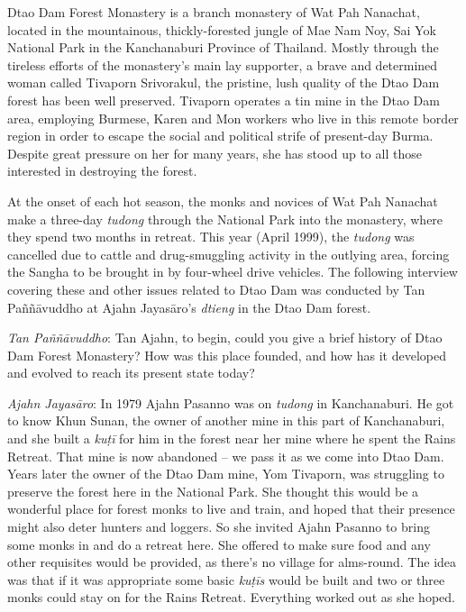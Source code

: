 
Dtao Dam Forest Monastery is a branch monastery of Wat Pah Nanachat, 
located in the mountainous, thickly-forested jungle of Mae Nam Noy, Sai
Yok National Park in the Kanchanaburi Province of Thailand. Mostly
through the tireless efforts of the monastery's main lay supporter, a
brave and determined woman called Tivaporn Srivorakul, the pristine, 
lush quality of the Dtao Dam forest has been well preserved. Tivaporn
operates a tin mine in the Dtao Dam area, employing Burmese, Karen and
Mon workers who live in this remote border region in order to escape the
social and political strife of present-day Burma. Despite great pressure
on her for many years, she has stood up to all those interested in
destroying the forest. 

At the onset of each hot season, the monks and novices of Wat Pah
Nanachat make a three-day \emph{tudong} through the National Park into
the monastery, where they spend two months in retreat. This year (April
 1999), the \emph{tudong} was cancelled due to cattle and
drug-smuggling activity in the outlying area, forcing the Sangha to be
brought in by four-wheel drive vehicles. The following interview
covering these and other issues related to Dtao Dam was conducted by Tan
Paññāvuddho at Ajahn Jayasāro's \emph{dtieng} in the Dtao Dam forest. 

\emph{Tan Paññāvuddho}: Tan Ajahn, to begin, could you give a brief
history of Dtao Dam Forest Monastery? How was this place founded, and
how has it developed and evolved to reach its present state today? 

\emph{Ajahn Jayasāro}: In 1979 Ajahn Pasanno was on \emph{tudong} in
Kanchanaburi. He got to know Khun Sunan, the owner of another mine in
this part of Kanchanaburi, and she built a \emph{kuṭī} for him in the
forest near her mine where he spent the Rains Retreat. That mine is now
abandoned -- we pass it as we come into Dtao Dam. Years later the owner
of the Dtao Dam mine, Yom Tivaporn, was struggling to preserve the
forest here in the National Park. She thought this would be a wonderful
place for forest monks to live and train, and hoped that their
presence might also deter hunters and loggers. So she invited Ajahn
Pasanno to bring some monks in and do a retreat here. She offered to
make sure food and any other requisites would be provided, as there's no
village for alms-round. The idea was that if it was appropriate some
basic \emph{kuṭīs} would be built and two or three monks could stay on
for the Rains Retreat. Everything worked out as she hoped. 

